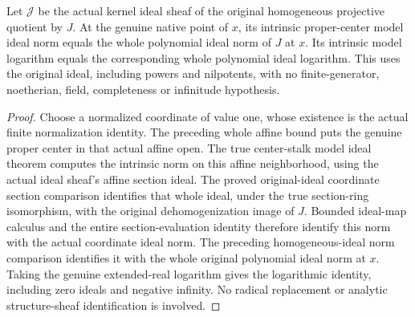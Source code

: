 \begin{theorem}
\label{projective:native-homogeneous-model-ideal-representation}
\leanok
{}
Let $\mathcal J$ be the actual kernel ideal sheaf of the original
homogeneous projective quotient by $J$. At the genuine native point of
$x$, its intrinsic proper-center model ideal norm equals the whole
polynomial ideal norm of $J$ at $x$. Its intrinsic model logarithm equals
the corresponding whole polynomial ideal logarithm. This uses the
original ideal, including powers and nilpotents, with no finite-generator,
noetherian, field, completeness or infinitude hypothesis.
\end{theorem}
\begin{proof}
Choose a normalized coordinate of value one, whose existence is the
actual finite normalization identity. The preceding whole affine bound
puts the genuine proper center in that actual affine open. The true
center-stalk model ideal theorem computes the intrinsic norm on this
affine neighborhood, using the actual ideal sheaf's affine section ideal.
The proved original-ideal coordinate section comparison identifies that
whole ideal, under the true section-ring isomorphism, with the original
dehomogenization image of $J$. Bounded ideal-map calculus and the entire
section-evaluation identity therefore identify this norm with the actual
coordinate ideal norm. The preceding homogeneous-ideal norm comparison
identifies it with the whole original polynomial ideal norm at $x$.
Taking the genuine extended-real logarithm gives the logarithmic
identity, including zero ideals and negative infinity. No radical
replacement or analytic structure-sheaf identification is involved.
\end{proof}
